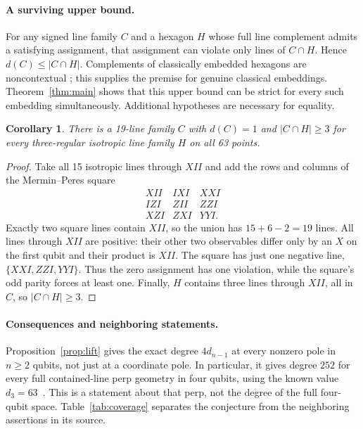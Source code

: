 \documentclass[10pt]{article}
\newtheorem{corollary}[theorem]{Corollary}
\begin{document}
\paragraph{A surviving upper bound.}
For any signed line family $C$ and a hexagon $H$ whose full line complement
admits a satisfying assignment, that assignment can violate only lines of
$C\cap H$. Hence $d(C)\le|C\cap H|$.
Complements of classically embedded hexagons are noncontextual
\cite{holweck}; this supplies the premise for genuine classical embeddings.
Theorem~\ref{thm:main} shows that this upper bound can be strict for every
such embedding simultaneously. Additional hypotheses are necessary for
equality.

\begin{corollary}\label{cor:small}
There is a 19-line family $C$ with $d(C)=1$ and $|C\cap H|\ge3$ for every
three-regular isotropic line family $H$ on all 63 points.
\end{corollary}
\begin{proof}
Take all 15 isotropic lines through $XII$ and add the rows and columns of
the Mermin--Peres square
\[
\begin{array}{ccc}
XII&IXI&XXI\\ IZI&ZII&ZZI\\ XZI&ZXI&YYI.
\end{array}
\]
Exactly two square lines contain $XII$, so the union has $15+6-2=19$
lines. All lines through $XII$ are positive: their other two observables
differ only by an $X$ on the first qubit and their product is $XII$.
The square has just one negative line, $\{XXI,ZZI,YYI\}$.
Thus the zero assignment has one violation, while the square's odd parity
forces at least one. Finally, $H$ contains three lines through $XII$, all in
$C$, so $|C\cap H|\ge3$.
\end{proof}
\paragraph{Consequences and neighboring statements.}
Proposition~\ref{prop:lift} gives the exact degree $4d_{n-1}$ at every nonzero
pole in $n\ge2$ qubits, not just at a coordinate pole. In particular, it gives
degree $252$ for every full contained-line perp geometry in four qubits,
using the known value
$d_3=63$~\cite[Section~4.1]{saniga}. This is a statement about that perp,
not the degree of the full four-qubit space. Table~\ref{tab:coverage}
separates the conjecture from the neighboring assertions in its source.
\end{document}
